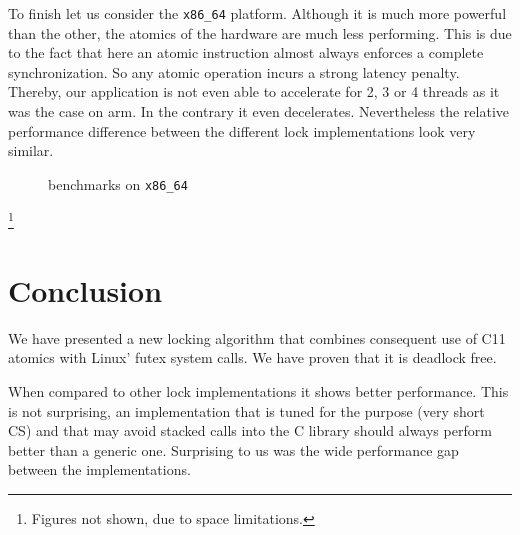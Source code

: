 To finish let us consider the \texttt{x86\_64} platform. Although it
is much more powerful than the other, the atomics of the hardware
are much less performing. This is due to the fact that here an
atomic instruction almost always enforces a complete
synchronization. So any atomic operation incurs a strong latency
penalty. Thereby, our application is not even able to accelerate for
2, 3 or 4 threads as it was the case on arm. In the contrary it
even decelerates.
Nevertheless the relative performance difference between the
different lock implementations look very similar.%
\iflong
\begin{figure}[t]
  \caption{benchmarks on \texttt{x86\_64}}
  \label{fig:x86_64}
\end{figure}
\else
\footnote{Figures not shown, due to space limitations.}
\fi

\section{Conclusion}
\label{sec-5}

We have presented a new locking algorithm that combines consequent use
of C11 atomics with Linux' futex system calls. We have proven that it
is deadlock free.

When compared to other lock implementations it shows better
performance. This is not surprising, an implementation that is tuned
for the purpose (very short CS) and that may avoid stacked calls into
the C library should always perform better than a generic one.
Surprising to us was the wide performance gap between the
implementations.

